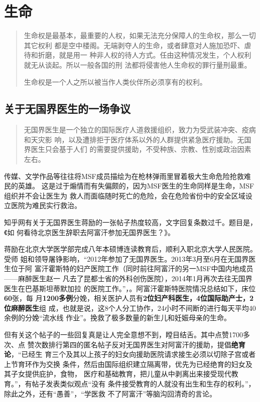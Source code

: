 \chapter{生命}

\begin{quotation}
  生命权是最基本，最重要的人权，如果无法充分保障人的生命权，那么一切其它权利
  都是空中楼阁。无端剥夺人的生命，或者肆意对人施加恐吓、虐待和折磨，就是用一
  种非人权的待人方式。任由这种情况发生，个人权利就无从谈起。所以一般各国的刑
  法都将侵害他人生命权的罪行量刑最重。

  生命权是一个人之所以被当作人类伙伴所必须享有的权利。\cite{renquanwiki}
\end{quotation}

\section{关于无国界医生的一场争议}

\begin{quotation}
  无国界医生是一个独立的国际医疗人道救援组织，致力为受武装冲突、疫病和天灾影
  响，以及遭排拒于医疗体系以外的人群提供紧急医疗援助。无国界医生只会基于人们
  的需要提供援助，不受种族、宗教、性别或政治因素左右。
\end{quotation}

传媒、文学作品等往往将MSF成员描绘为在枪林弹雨里冒着极大生命危险抢救难民的英雄。
这是过于煽情而有失偏颇的，因为MSF医生的生命同样是生命，MSF组织并不会让医生为
救人而面临随时死亡的危险，会在危险省份中的安全区域设立医院为难民实行救治。

知乎网有关于无国界医生蒋励的一张帖子热度较高，文字回复条数过千。题目是，《如
何看待北京医生辞职去阿富汗参加无国界医生？》。\cite{kandaijiangli}

蒋励在北京大学医学部完成八年本硕博连读教育后，顺利入职北京大学人民医院。受师
姐和领导屠铮影响，“2012年参加了无国界医生。2013年3月至6月在无国界医生位于阿
富汗霍斯特的妇产医院工作（同时前往阿富汗的另一MSF中国内地成员——麻醉医生赵一
凡去了昆都士省的外科创伤医院），2014年1月再次去往无国界医生在巴基斯坦蒂默加拉
的医院工作。”，\cite{jiangli}。阿富汗霍斯特医院情况总结如下，床位\textbf{60}张，每
月\textbf{1200多例}分娩，相关医护人员有\textbf{2位妇产科医生，4位国际助产士，2位麻醉医生}组
成，也就是说，这8个人分工协作，24小时不间断的进行每天平均40余例的分娩“流水线
作业”。挽救了极多数量的新生儿和妊娠母亲的生命。

但有关这个帖子的一些回复真是让人完全意想不到，瞠目结舌。其中点赞1700多次、点
赞次数排行第四的匿名帖子反对无国界医生对阿富汗的援助，提倡\textbf{绝育论}，“已经生
育三个及其以上孩子的妇女向援助医院请求接生必须以切除子宫或者上节育环作为交换
条件，然后由国际组织建立隔离带，优先为已经绝育的妇女及其子女提供庇护，食物，
医疗和基础教育，把儿童从中剥离出来接受现代教育。”，有帖子发表类似观点“没有
条件接受教育的人就没有出生和生存的权利。”，除此之外，还有“愚善”，“学医救
不了阿富汗”等脑沟回清奇的言论。

